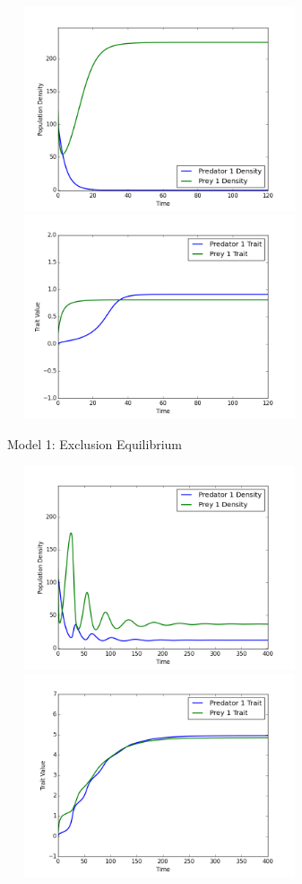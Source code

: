 \documentclass{amsart}
\theoremstyle{definition}
\theoremstyle{remark}
\numberwithin{equation}{section}
\begin{document}
\begin{centering}
	\begin{figure}[h]
		\includegraphics[width=9cm,height=6cm]{figures/1x1/constant_growth/densities_exclusion.png}
		\includegraphics[width=9cm,height=6cm]{figures/1x1/constant_growth/traits_exclusion.png}
		\caption{Model 1: Exclusion Equilibrium}
		\label{fig:constant_growth_exclusion}
	\end{figure}
	\begin{figure}[h]
		\includegraphics[width=9cm,height=6cm]{figures/1x1/constant_growth/densities_stable_coexistence.png}
		\includegraphics[width=9cm,height=6cm]{figures/1x1/constant_growth/traits_stable_coexistence.png}

\end{figure}
\end{centering}
\end{document}
